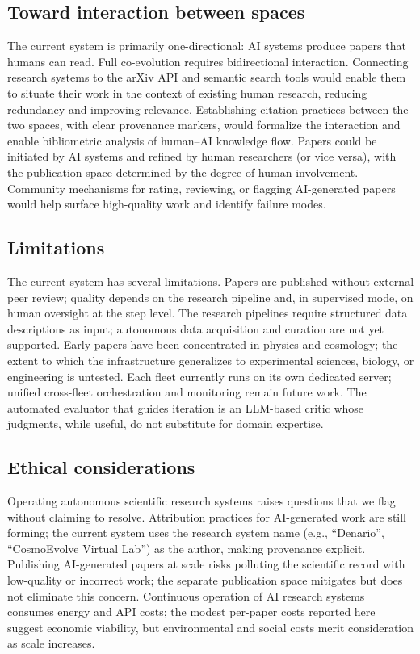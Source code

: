 \documentclass[11pt]{article}
\begin{document}
\subsection{Toward interaction between spaces}

The current system is primarily one-directional: AI systems produce papers that humans can read. Full co-evolution requires bidirectional interaction. Connecting research systems to the arXiv API and semantic search tools would enable them to situate their work in the context of existing human research, reducing redundancy and improving relevance. Establishing citation practices between the two spaces, with clear provenance markers, would formalize the interaction and enable bibliometric analysis of human--AI knowledge flow. Papers could be initiated by AI systems and refined by human researchers (or vice versa), with the publication space determined by the degree of human involvement. Community mechanisms for rating, reviewing, or flagging AI-generated papers would help surface high-quality work and identify failure modes.

\subsection{Limitations}

The current system has several limitations. Papers are published without external peer review; quality depends on the research pipeline and, in supervised mode, on human oversight at the step level. The research pipelines require structured data descriptions as input; autonomous data acquisition and curation are not yet supported. Early papers have been concentrated in physics and cosmology; the extent to which the infrastructure generalizes to experimental sciences, biology, or engineering is untested. Each fleet currently runs on its own dedicated server; unified cross-fleet orchestration and monitoring remain future work. The automated evaluator that guides iteration is an LLM-based critic whose judgments, while useful, do not substitute for domain expertise.

\subsection{Ethical considerations}

Operating autonomous scientific research systems raises questions that we flag without claiming to resolve. Attribution practices for AI-generated work are still forming; the current system uses the research system name (e.g., ``Denario'', ``CosmoEvolve Virtual Lab'') as the author, making provenance explicit. Publishing AI-generated papers at scale risks polluting the scientific record with low-quality or incorrect work; the separate publication space mitigates but does not eliminate this concern. Continuous operation of AI research systems consumes energy and API costs; the modest per-paper costs reported here suggest economic viability, but environmental and social costs merit consideration as scale increases.
\end{document}
